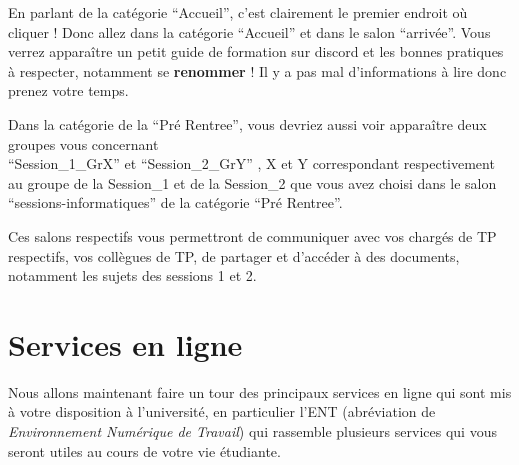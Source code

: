 \documentclass{article}
\begin{document}
\begin{exercice}[Le discord de la L1]
En parlant de la catégorie ``Accueil'', c'est clairement le premier endroit où cliquer ! Donc allez dans la catégorie ``Accueil'' et dans le salon ``arrivée''. Vous verrez apparaître un petit guide de formation sur discord et les bonnes pratiques à respecter, notamment se \textbf{renommer} ! Il y a pas mal d'informations à lire donc prenez votre temps.

Dans la catégorie de la ``Pré Rentree'', vous devriez aussi voir apparaître deux groupes vous concernant \\
``Session\_1\_GrX'' et ``Session\_2\_GrY'' , X et Y correspondant respectivement au groupe de la Session\_1 et de la Session\_2 que vous avez choisi dans le salon ``sessions-informatiques'' de la catégorie ``Pré Rentree''.

Ces salons respectifs vous permettront de communiquer avec vos chargés de TP respectifs, vos collègues de TP, de partager et d'accéder à des documents, notamment les sujets des sessions 1 et 2.

\end{exercice}

\section {Services en ligne}

Nous allons maintenant faire un tour des principaux services en ligne qui sont
mis à votre disposition à l'université, en particulier l'ENT (abréviation de
\emph{Environnement Numérique de Travail}) qui rassemble plusieurs services qui vous
seront utiles au cours de votre vie étudiante. 
 
\end{document}
